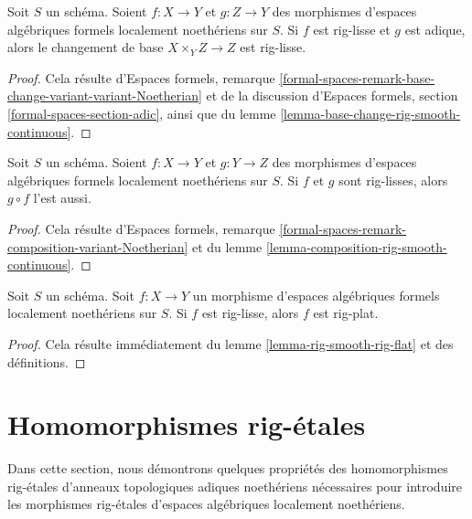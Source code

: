 \begin{lemma}
\label{lemma-base-change-rig-smooth}
Soit $S$ un schéma. Soient $f : X \to Y$ et $g : Z \to Y$
des morphismes d'espaces algébriques formels localement noethériens sur $S$.
Si $f$ est rig-lisse et $g$ est adique, alors le changement de base
$X \times_Y Z \to Z$ est rig-lisse.
\end{lemma}

\begin{proof}
Cela résulte d'Espaces formels, remarque
\ref{formal-spaces-remark-base-change-variant-variant-Noetherian}
et de la discussion d'Espaces formels, section
\ref{formal-spaces-section-adic},
ainsi que du lemme \ref{lemma-base-change-rig-smooth-continuous}.
\end{proof}

\begin{lemma}
\label{lemma-composition-rig-smooth}
Soit $S$ un schéma. Soient $f : X \to Y$ et $g : Y \to Z$
des morphismes d'espaces algébriques formels localement noethériens sur $S$.
Si $f$ et $g$ sont rig-lisses, alors $g \circ f$ l'est aussi.
\end{lemma}

\begin{proof}
Cela résulte d'Espaces formels, remarque
\ref{formal-spaces-remark-composition-variant-Noetherian}
et du lemme \ref{lemma-composition-rig-smooth-continuous}.
\end{proof}

\begin{lemma}
\label{lemma-rig-smooth-rig-flat-morphism}
Soit $S$ un schéma. Soit $f : X \to Y$ un morphisme d'espaces
algébriques formels localement noethériens sur $S$.
Si $f$ est rig-lisse, alors $f$ est rig-plat.
\end{lemma}

\begin{proof}
Cela résulte immédiatement du lemme \ref{lemma-rig-smooth-rig-flat}
et des définitions.
\end{proof}









\section{Homomorphismes rig-étales}
\label{section-rig-etale-homomorphisms}

\noindent
Dans cette section, nous démontrons quelques propriétés des homomorphismes
rig-étales d'anneaux topologiques adiques noethériens nécessaires pour
introduire les morphismes rig-étales d'espaces algébriques localement noethériens.

